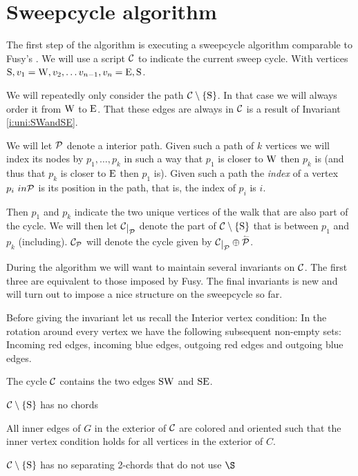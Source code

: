 
\section{Sweepcycle algorithm}
  \label{s:sweep}
  The first step of the algorithm is executing a sweepcycle algorithm comparable to Fusy's \cite{Fusy2006}. We will use a script $\C$ to indicate the current sweep cycle. With vertices $\pS, v_1 = \pW, v_2, \ldots v_{n-1}, v_n = \pE, \pS$.

  We will repeatedly only consider the path $\cpath$. In that case we will always order it from $\pW$ to $\pE$. That these edges are always in $\C$ is a result of Invariant \ref{i:uni:SWandSE}.

  We will let $\P$ denote a interior path. Given such a path of $k$ vertices we will index its nodes by $p_1, \ldots, p_k$ in such a way that $p_1$ is closer to $\pW$ then $p_k$ is (and thus that $p_k$ is closer to $\pE$ then $p_1$ is). Given such a path the \emph{index} of a vertex $p_i\ in \P$ is its position in the path, that is, the index of $p_i$ is $i$.

  Then $p_1$ and $p_k$ indicate the two unique vertices of the walk that are also part of the cycle. We will then let $\restC{\P}$ denote the part of $\cpath$ that is between $p_1$ and $p_k$ (including). $\C_\P$ will denote the cycle given by $\restC{\P} \oplus \rev{\P}$.

  During the algorithm we will want to maintain several invariants on $\C$. The first three are equivalent to those imposed by Fusy. The final invariants is new and will turn out to impose a nice structure on the sweepcycle so far.

  Before giving the invariant let us recall the Interior vertex condition: In the rotation around every vertex we have the following subsequent non-empty sets: Incoming red edges, incoming blue edges, outgoing red edges and outgoing blue edges.

  \begin{invariants}
    \itemsep=-4pt

    \item \label{i:uni:SWandSE} The cycle $\C$ contains the two edges $\pS \pW$ and $\pS \pE$.
    \item \label{i:uni:noChords} $\cpath$ has no chords
    \item \label{i:uni:intVertCond} All inner edges of $G$ in the exterior of $\C$ are colored and oriented such that the inner vertex condition holds for all vertices in the exterior of $C$.
    \item \label{i:uni:no2Chords} $\C\sm{\pS}$ has no separating 2-chords that do not use $\S$
  \end{invariants}

